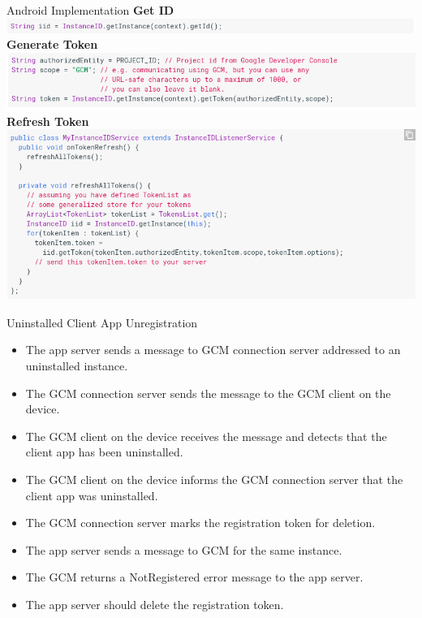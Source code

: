 \documentclass[10pt]{beamer}
\begin{document}
\begin{frame}[fragile]{Android Implementation}
	\textbf{Get ID}
		\includegraphics[width=\textwidth-10mm]{code1.png}\\
	\textbf{Generate Token}
		\includegraphics[width=\textwidth-10mm]{code2.png}\\
	\textbf{Refresh Token}
		\includegraphics[width=\textwidth-10mm]{code3.png}
\end{frame}
\begin{frame}[fragile]{Uninstalled Client App Unregistration}
\begin{itemize}
  \item The app server sends a message to GCM connection server addressed to an uninstalled instance.
  \item The GCM connection server sends the message to the GCM client on the device.
  \item The GCM client on the device receives the message and detects that the client app has been uninstalled.
  \item The GCM client on the device informs the GCM connection server that the client app was uninstalled.
  \item The GCM connection server marks the registration token for deletion.
  \item The app server sends a message to GCM for the same instance.
  \item The GCM returns a NotRegistered error message to the app server.
  \item The app server should delete the registration token.
\end{itemize}
\end{frame}
\end{document}

